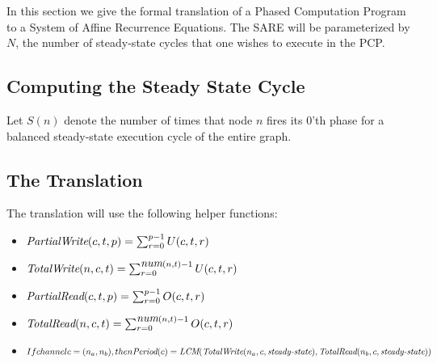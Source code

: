 In this section we give the formal translation of a Phased Computation
Program to a System of Affine Recurrence Equations.  The SARE will be
parameterized by $N$, the number of steady-state cycles that one
wishes to execute in the PCP.

\subsection{Computing the Steady State Cycle}

Let $S(n)$ denote the number of times that node $n$ fires its 0'th
phase for a balanced steady-state execution cycle of the entire graph.

\subsection{The Translation}

The translation will use the following helper functions:
\begin{itemize}

\item $\mbox{\it PartialWrite}(c,t,p) = \sum_{r=0}^{p-1} U(c, t, r)$

\item $\mbox{\it TotalWrite}(n,c,t) = \sum_{r=0}^{\mbox{\it num}(n, t)-1} U(c, t, r)$

\item $\mbox{\it PartialRead}(c,t,p) = \sum_{r=0}^{p-1} O(c, t, r)$

\item $\mbox{\it TotalRead}(n,c,t) =  \sum_{r=0}^{\mbox{\it num}(n, t)-1} O(c, t, r)$

\item $If channel c = (n_a, n_b), then \mbox{\it Period}(c) = \mbox{\it LCM}(\mbox{\it TotalWrite}(n_a, c, \mbox{\it steady-state}), \mbox{\it TotalRead}(n_b, c, \mbox{\it steady-state}))$

\end{itemize}

